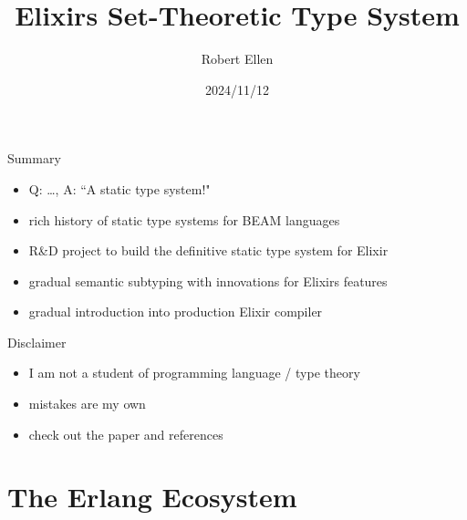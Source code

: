 \documentclass[
  ignorenonframetext,
  aspectratio=169]{beamer}
\title{Elixir\textquotesingle s Set-Theoretic Type System}
\author{Robert Ellen}
\date{2024/11/12}
\providecommand{\tightlist}{%
  \setlength{\itemsep}{0pt}\setlength{\parskip}{0pt}}
\begin{document}
\frame{\titlepage}

\begin{frame}{Summary}
\label{summary}
\begin{itemize}
\tightlist
\item
  Q: \ldots, A: ``A static type system!"
\item
  rich history of static type systems for BEAM languages
\item
  R\&D project to build the definitive static type system for Elixir
\item
  gradual semantic subtyping with innovations for
  Elixir\textquotesingle s features
\item
  gradual introduction into production Elixir compiler
\end{itemize}
\end{frame}

\begin{frame}{Disclaimer}
\label{disclaimer}
\begin{itemize}
\tightlist
\item
  I am not a student of programming language / type theory
\item
  mistakes are my own
\item
  check out the paper and references
\end{itemize}
\end{frame}

\section{The Erlang Ecosystem}\label{the-erlang-ecosystem}
\end{document}
